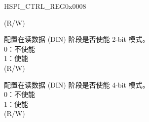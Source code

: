 \begin{register}{H}{SPI\_CTRL\_REG}{0x0008}
\begin{regdesc}
\begin{reglist}
(R/W)
\label{fielddesc:SPI3FREADDUAL}\item [SPI\_FREAD\_DUAL] 配置在读数据 (DIN) 阶段是否使能 2-bit 模式。\\
0：不使能 \\
1：使能 \\

(R/W)
\label{fielddesc:SPI3FREADQUAD}\item [SPI\_FREAD\_QUAD] 配置在读数据 (DIN) 阶段是否使能 4-bit 模式。 \\
0：不使能 \\
1：使能 \\

(R/W)
\item [见下页]
\end{reglist}\end{regdesc}
\end{register}

